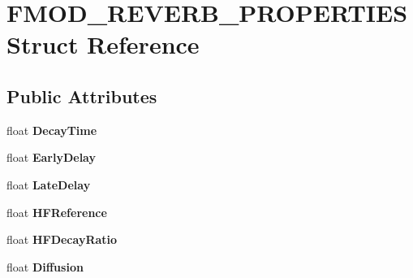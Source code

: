 \hypertarget{struct_f_m_o_d___r_e_v_e_r_b___p_r_o_p_e_r_t_i_e_s}{\section{F\+M\+O\+D\+\_\+\+R\+E\+V\+E\+R\+B\+\_\+\+P\+R\+O\+P\+E\+R\+T\+I\+E\+S Struct Reference}
\label{struct_f_m_o_d___r_e_v_e_r_b___p_r_o_p_e_r_t_i_e_s}
}
\subsection*{Public Attributes}
\begin{DoxyCompactItemize}
\item 
\hypertarget{struct_f_m_o_d___r_e_v_e_r_b___p_r_o_p_e_r_t_i_e_s_a96c2f0bf909c70708440ff25b709fd43}{float {\bfseries Decay\+Time}}\label{struct_f_m_o_d___r_e_v_e_r_b___p_r_o_p_e_r_t_i_e_s_a96c2f0bf909c70708440ff25b709fd43}

\item 
\hypertarget{struct_f_m_o_d___r_e_v_e_r_b___p_r_o_p_e_r_t_i_e_s_aa5bbe3e02a57f21c97a0a2bd520bde00}{float {\bfseries Early\+Delay}}\label{struct_f_m_o_d___r_e_v_e_r_b___p_r_o_p_e_r_t_i_e_s_aa5bbe3e02a57f21c97a0a2bd520bde00}

\item 
\hypertarget{struct_f_m_o_d___r_e_v_e_r_b___p_r_o_p_e_r_t_i_e_s_a5931de0fd5b8705eb043d272e87c42d5}{float {\bfseries Late\+Delay}}\label{struct_f_m_o_d___r_e_v_e_r_b___p_r_o_p_e_r_t_i_e_s_a5931de0fd5b8705eb043d272e87c42d5}

\item 
\hypertarget{struct_f_m_o_d___r_e_v_e_r_b___p_r_o_p_e_r_t_i_e_s_ac0d48e7775cc35e434535d7b0f41d425}{float {\bfseries H\+F\+Reference}}\label{struct_f_m_o_d___r_e_v_e_r_b___p_r_o_p_e_r_t_i_e_s_ac0d48e7775cc35e434535d7b0f41d425}

\item 
\hypertarget{struct_f_m_o_d___r_e_v_e_r_b___p_r_o_p_e_r_t_i_e_s_a7371380136e7ff3fd70c8059df9981b8}{float {\bfseries H\+F\+Decay\+Ratio}}\label{struct_f_m_o_d___r_e_v_e_r_b___p_r_o_p_e_r_t_i_e_s_a7371380136e7ff3fd70c8059df9981b8}

\item 
\hypertarget{struct_f_m_o_d___r_e_v_e_r_b___p_r_o_p_e_r_t_i_e_s_ae4b36833e4d30de592c954af2f0c55b3}{float {\bfseries Diffusion}}\label{struct_f_m_o_d___r_e_v_e_r_b___p_r_o_p_e_r_t_i_e_s_ae4b36833e4d30de592c954af2f0c55b3}


\end{DoxyCompactItemize}

